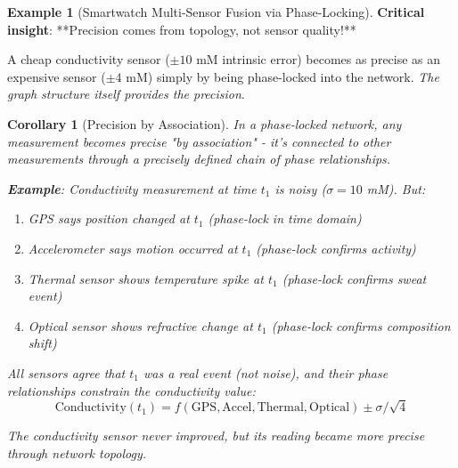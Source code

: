 \documentclass[11pt,a4paper]{article}
\newtheorem{corollary}[theorem]{Corollary}
\theoremstyle{definition}
\newtheorem{example}[theorem]{Example}
\theoremstyle{remark}
\begin{document}
\begin{example}[Smartwatch Multi-Sensor Fusion via Phase-Locking]
\textbf{Critical insight}: **Precision comes from topology, not sensor quality!**

A cheap conductivity sensor ($\pm 10$ mM intrinsic error) becomes as precise as an expensive sensor ($\pm 4$ mM) simply by being phase-locked into the network. \textit{The graph structure itself provides the precision}.
\end{example}

\begin{corollary}[Precision by Association]
In a phase-locked network, \textit{any} measurement becomes precise "by association" - it's connected to other measurements through a precisely defined chain of phase relationships.

\textbf{Example}: Conductivity measurement at time $t_1$ is noisy ($\sigma = 10$ mM). But:
\begin{enumerate}
\item GPS says position changed at $t_1$ (phase-lock in time domain)
\item Accelerometer says motion occurred at $t_1$ (phase-lock confirms activity)
\item Thermal sensor shows temperature spike at $t_1$ (phase-lock confirms sweat event)
\item Optical sensor shows refractive change at $t_1$ (phase-lock confirms composition shift)
\end{enumerate}

All sensors agree that $t_1$ was a real event (not noise), and their phase relationships constrain the conductivity value:
\begin{equation}
\text{Conductivity}(t_1) = f(\text{GPS}, \text{Accel}, \text{Thermal}, \text{Optical}) \pm \sigma/\sqrt{4}
\end{equation}

The conductivity sensor never improved, but its \textit{reading} became more precise through network topology.
\end{corollary}
\end{document}
